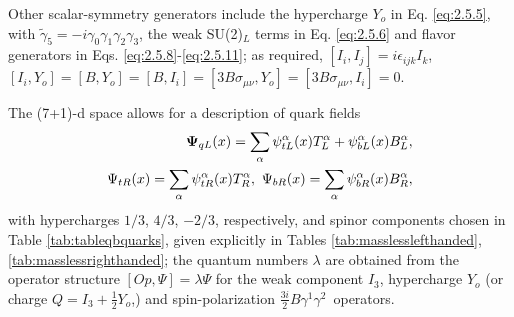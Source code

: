 \documentclass[12pt]{article}
\renewcommand\[{\begin{dmath}}
\renewcommand\]{\end{dmath}}
\newcommand{\boldmathPsi}{\mbox{\boldmath$\Psi$\unboldmath}}
\begin{document}
Other scalar-symmetry  generators
 include   the hypercharge
$  Y_o$ in Eq.   \ref{eq:2.5.5},
 with $\tilde{\gamma}_{5}=-i\gamma_{0}\gamma_{1}\gamma_{2}\gamma_{3}$,
the weak SU(2)$_L$ terms in Eq.  \ref{eq:2.5.6}
  and  flavor generators in Eqs.  \ref{eq:2.5.8}-\ref{eq:2.5.11};
  as required, $[I_i,I_j]=i\epsilon_{ijk}I_k$, $[I_i,Y_o]=[B, Y_o]=[B,I_i]=[3 B \sigma_{\mu\nu},Y_o]=[3 B \sigma_{\mu\nu},I_i]=0$.

The (7+1)-d  space  allows    for   a description of  quark fields
\begin{eqnarray} \label{quarkfields}\boldmathPsi_{qL}(x)=\sum_\alpha
   \psi_{tL}^\alpha(x) T_{L}^\alpha  +
 \psi_{bL}^\alpha(x) B_{L}^\alpha,    \\ \nonumber
  { \Psi_{tR} }(x)=\sum_\alpha \psi_{tR}^\alpha(x)T^\alpha_R, \  { \Psi_{bR}  }(x)=\sum_\alpha \psi_{bR}^\alpha (x)B^\alpha_R,
  \end{eqnarray} with hypercharges $1/3$,  $4/3$,      $-2/3$, respectively,
   and spinor components chosen in Table \ref{tab:tableqbquarks}, given explicitly in Tables \ref {tab:masslesslefthanded}, \ref {tab:masslessrighthanded}; the quantum numbers $\lambda$ are obtained from
 the operator structure $[Op,\Psi]=\lambda  \Psi   $ for the weak component $I_3$,  hypercharge $Y_o$ (or charge $Q=I_3+\frac{1}{2}Y_o$,) and   spin-polarization $\frac{3i}{2}B\gamma^{1}\gamma^{2}$\ operators.
\end{document}
